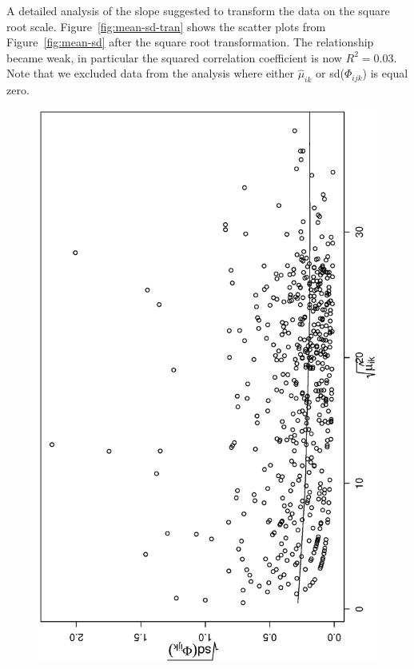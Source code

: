 \documentclass[11pt, fleqn]{article}
\begin{document}
A detailed analysis of the slope suggested to transform the data on the square
root scale. Figure~\ref{fig:mean-sd-tran} shows the scatter plots from
Figure~\ref{fig:mean-sd} after the square root transformation. The
relationship became weak, in particular the squared correlation coefficient is
now $R^2 = 0.03$. Note that we excluded data from the analysis where either
$\hat{\mu}_{ik}$ or sd($\Phi_{ijk}$) is equal zero.

\begin{figure}[t]
\begin{center}
\begin{minipage}{8cm}
\includegraphics[scale=0.3, angle=-90]{pic/hu_mean_sd_all_tran.ps}

\end{minipage}
\end{center}
\end{figure}
\end{document}
